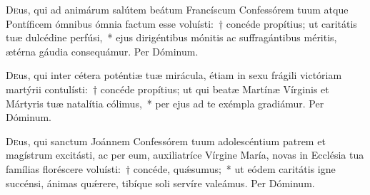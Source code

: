 \documentclass[vesperale_romanum.tex]{subfiles}
\begin{document}
\oratio

\lettrine{D}{e}us, qui ad animárum salútem beátum Francíscum Confessórem tuum atque Pontíficem ómnibus ómnia factum esse voluísti:~† concéde propítius; ut caritátis tuæ dulcédine perfúsi,~* ejus dirigéntibus mónitis ac suffragántibus méritis, ætérna gáudia consequámur.
Per Dóminum.


\commsequentis

\myrule
{}

\semiduplex


\oratio

\lettrine{D}{e}us, qui inter cétera poténtiæ tuæ mirácula, étiam in sexu frágili vi\-ctóriam martýrii contulísti:~† concéde propítius; ut qui beatæ Martínæ Vírginis et Mártyris tuæ natalítia cólimus,~* per ejus ad te exémpla gradiámur. Per Dóminum.





\vespsequentiscomm

\myrule
\newpage


\duplex

\oratio

\lettrine{D}{e}us, qui sanctum Joánnem Confessórem tuum adolescéntium patrem et magístrum excitásti, ac per eum, auxiliatríce Vírgine María, novas in Ecclésia tua famílias floréscere voluísti:~† concéde, quǽsumus;~* ut eódem caritátis igne succénsi, ánimas quǽrere, tibíque soli servíre valeámus.
Per Dóminum.
 

\capitdeseq

\myrule
\end{document}
